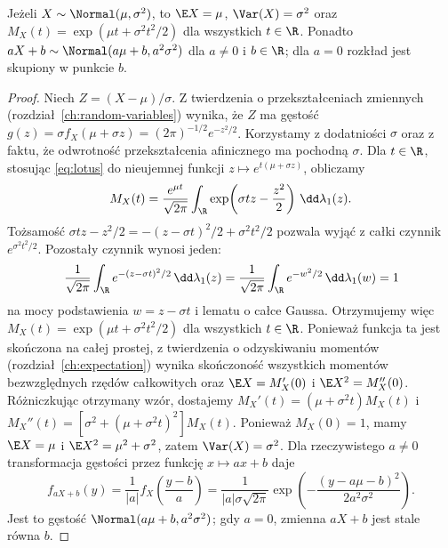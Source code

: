 \begin{stwierdzenie}
Jeżeli $X\sim\Normal(\mu,\sigma^2)$, to
$\E X=\mu$, $\Var(X)=\sigma^2$ oraz
$M_X(t)=\exp(\mu t+\sigma^2t^2/2)$ dla wszystkich $t\in\R$.
Ponadto $aX+b\sim\Normal(a\mu+b,a^2\sigma^2)$
dla $a\ne0$ i $b\in\R$; dla $a=0$ rozkład jest skupiony
w punkcie $b$.
\end{stwierdzenie}
\begin{proof}
Niech $Z=(X-\mu)/\sigma$. Z twierdzenia o
przekształceniach zmiennych (rozdział~\ref{ch:random-variables})
wynika, że $Z$ ma gęstość
$g(z)=\sigma f_X(\mu+\sigma z)=(2\pi)^{-1/2}e^{-z^2/2}$.
Korzystamy z dodatniości $\sigma$ oraz z faktu,
że odwrotność przekształcenia afinicznego ma pochodną $\sigma$.
Dla $t\in\R$, stosując \eqref{eq:lotus} do nieujemnej
funkcji $z\mapsto e^{t(\mu+\sigma z)}$, obliczamy
\[
M_X(t)=\frac{e^{\mu t}}{\sqrt{2\pi}}\int_\R
\exp\!\left(\sigma tz-\frac{z^2}2\right)
\,\dd\lambda_1(z).
\]
Tożsamość
$\sigma tz-z^2/2=-(z-\sigma t)^2/2+\sigma^2t^2/2$
pozwala wyjąć z całki czynnik
$e^{\sigma^2t^2/2}$. Pozostały czynnik wynosi jeden:
\[
\frac1{\sqrt{2\pi}}\int_\R e^{-(z-\sigma t)^2/2}\,
\dd\lambda_1(z)
=\frac1{\sqrt{2\pi}}\int_\R e^{-w^2/2}\,\dd\lambda_1(w)=1
\]
na mocy podstawienia $w=z-\sigma t$ i lematu o całce Gaussa.
Otrzymujemy więc
$M_X(t)=\exp(\mu t+\sigma^2t^2/2)$
dla wszystkich $t\in\R$.
Ponieważ funkcja ta jest skończona na całej prostej,
z twierdzenia o odzyskiwaniu momentów
(rozdział~\ref{ch:expectation}) wynika skończoność
wszystkich momentów bezwzględnych rzędów całkowitych oraz
$\E X=M_X'(0)$ i $\E X^2=M_X''(0)$.
Różniczkując otrzymany wzór, dostajemy
$M_X'(t)=(\mu+\sigma^2t)M_X(t)$ i
$M_X''(t)=[\sigma^2+(\mu+\sigma^2t)^2]M_X(t)$.
Ponieważ $M_X(0)=1$, mamy $\E X=\mu$ i
$\E X^2=\mu^2+\sigma^2$, zatem $\Var(X)=\sigma^2$.
Dla rzeczywistego $a\ne0$ transformacja gęstości
przez funkcję $x\mapsto ax+b$ daje
\[
f_{aX+b}(y)=\frac1{|a|}f_X\!\left(\frac{y-b}{a}\right)
=\frac1{|a|\sigma\sqrt{2\pi}}
\exp\!\left(-\frac{(y-a\mu-b)^2}{2a^2\sigma^2}\right).
\]
Jest to gęstość $\Normal(a\mu+b,a^2\sigma^2)$;
gdy $a=0$, zmienna $aX+b$ jest stale równa $b$.
\end{proof}

